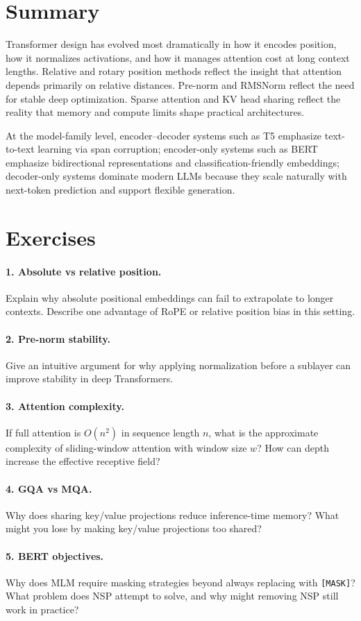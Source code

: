 \section{Summary}
Transformer design has evolved most dramatically in how it encodes position, how it normalizes activations, and how it manages attention cost at long context lengths. Relative and rotary position methods reflect the insight that attention depends primarily on relative distances. Pre-norm and RMSNorm reflect the need for stable deep optimization. Sparse attention and KV head sharing reflect the reality that memory and compute limits shape practical architectures.

At the model-family level, encoder--decoder systems such as T5 emphasize text-to-text learning via span corruption; encoder-only systems such as BERT emphasize bidirectional representations and classification-friendly embeddings; decoder-only systems dominate modern LLMs because they scale naturally with next-token prediction and support flexible generation.

\section{Exercises}
\paragraph{1. Absolute vs relative position.}
Explain why absolute positional embeddings can fail to extrapolate to longer contexts. Describe one advantage of RoPE or relative position bias in this setting.

\paragraph{2. Pre-norm stability.}
Give an intuitive argument for why applying normalization before a sublayer can improve stability in deep Transformers.

\paragraph{3. Attention complexity.}
If full attention is \(O(n^2)\) in sequence length \(n\), what is the approximate complexity of sliding-window attention with window size \(w\)? How can depth increase the effective receptive field?

\paragraph{4. GQA vs MQA.}
Why does sharing key/value projections reduce inference-time memory? What might you lose by making key/value projections too shared?

\paragraph{5. BERT objectives.}
Why does MLM require masking strategies beyond always replacing with \texttt{[MASK]}? What problem does NSP attempt to solve, and why might removing NSP still work in practice?
